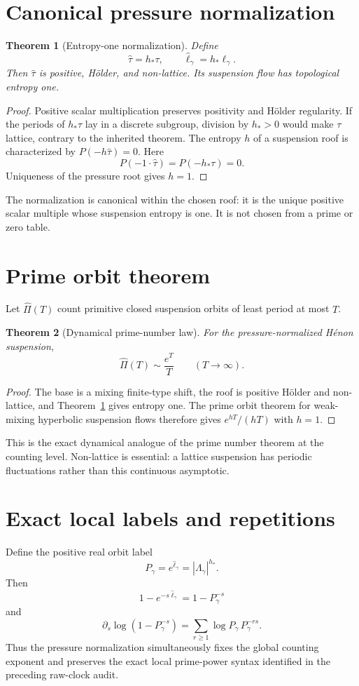 \documentclass[11pt]{article}
\newtheorem{theorem}{Theorem}[section]
\theoremstyle{remark}\newtheorem{remark}[theorem]{Remark}
\begin{document}
\section{Canonical pressure normalization}
\begin{theorem}[Entropy-one normalization]\label{thm:normalize}
Define
\[
\widehat\tau=h_*\tau,
\qquad
\widehat\ell_\gamma=h_*\ell_\gamma.
\]
Then $\widehat\tau$ is positive, H\"older, and non-lattice.  Its suspension
flow has topological entropy one.
\end{theorem}
\begin{proof}
Positive scalar multiplication preserves positivity and H\"older
regularity.  If the periods of $h_*\tau$ lay in a discrete subgroup, division
by $h_*>0$ would make $\tau$ lattice, contrary to the inherited theorem.
The entropy $h$ of a suspension roof is characterized by
$P(-h\widehat\tau)=0$.  Here
\[
P(-1\cdot\widehat\tau)=P(-h_*\tau)=0.
\]
Uniqueness of the pressure root gives $h=1$.
\end{proof}

The normalization is canonical within the chosen roof: it is the unique
positive scalar multiple whose suspension entropy is one.  It is not chosen
from a prime or zero table.

\section{Prime orbit theorem}
Let $\widehat\Pi(T)$ count primitive closed suspension orbits of least period
at most $T$.

\begin{theorem}[Dynamical prime-number law]\label{thm:pot}
For the pressure-normalized H\'enon suspension,
\[
\boxed{\widehat\Pi(T)\sim\frac{e^T}{T}}\qquad(T\to\infty).
\]
\end{theorem}
\begin{proof}
The base is a mixing finite-type shift, the roof is positive H\"older and
non-lattice, and Theorem~\ref{thm:normalize} gives entropy one.  The prime
orbit theorem for weak-mixing hyperbolic suspension flows therefore gives
$e^{hT}/(hT)$ with $h=1$.
\end{proof}

This is the exact dynamical analogue of the prime number theorem at the
counting level.  Non-lattice is essential: a lattice suspension has periodic
fluctuations rather than this continuous asymptotic.

\section{Exact local labels and repetitions}
Define the positive real orbit label
\[
P_\gamma=e^{\widehat\ell_\gamma}
=|\Lambda_\gamma|^{h_*}.
\]
Then
\[
1-e^{-s\widehat\ell_\gamma}=1-P_\gamma^{-s}
\]
and
\begin{equation}\label{eq:atoms}
\partial_s\log(1-P_\gamma^{-s})
=\sum_{r\ge1}\log P_\gamma\,P_\gamma^{-rs}.
\end{equation}
Thus the pressure normalization simultaneously fixes the global counting
exponent and preserves the exact local prime-power syntax identified in the
preceding raw-clock audit.
\end{document}
